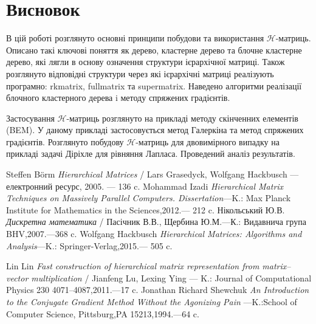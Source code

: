 \documentclass[12pt]{report}
\begin{document}
	\chapter{Висновок}
	\hspace{0.8cm} В цій роботі розглянуто основні принципи побудови та використання $\mathcal{H}$-матриць. Описано такі ключові поняття як дерево, кластерне дерево та блочне кластерне дерево, які лягли в основу означення структури ієрархічної матриці. Також розглянуто відповідні структури через які ієрархічні матриці реалізують програмно: rkmatrix, fullmatrix та supermatrix. Наведено алгоритми реалізації блочного кластерного дерева i методу спряжених градієнтів.
	\par Застосування $\mathcal{H}$-матриць розглянуто на прикладі методу скінченних елементів (BEM). У даному прикладі застосовується метод Галеркіна та метод спряжених градієнтів. Розглянуто побудову $\mathcal{H}$-матриць для двовимірного випадку на прикладі задачі Діріхле для рівняння Лапласа. Проведений аналіз результатів.
	\newpage
	\begin{thebibliography}{00}
	\normalsize{
	    	Steffen B\"orm {\it Hierarchical Matrices} / Lars Grasedyck, Wolfgang Hackbusch --- електронний ресурс, 2005. --- 136 c.
			Mohammad Izadi {\it Hierarchical Matrix Techniques on Massively Parallel Computers. Dissertation}---K.: Max Planck Institute for Mathematics in the Sciences,2012.--- 212 c.
			Нікольський Ю.В. {\it Дискретна математика} / Пасічник В.В., Щербина Ю.М.---К.: Видавнича група BHV,2007.---368 c.
			 Wolfgang Hackbusch {\it Hierarchical Matrices: Algorithms and Analysis}---K.: Springer-Verlag,2015.--- 505 c.
		
			Lin Lin {\it Fast construction of hierarchical matrix representation from matrix–vector
			multiplication } /  Jianfeng Lu, Lexing Ying --- K.: Journal of Computational Physics 230 4071–4087,2011.---17 c.
			Jonathan Richard Shewchuk {\it An Introduction to the Conjugate Gradient Method Without the Agonizing Pain }---K.:School of Computer Science, Pittsburg,PA 15213,1994.---64 c. 	 
	}
	\end{thebibliography}	
\end{document}

